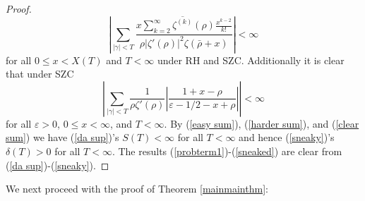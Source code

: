 \documentclass[11pt,article]{amsart}
\numberwithin{equation}{section}
\numberwithin{equation}{section}
\numberwithin{lemma}{section}
\numberwithin{prop}{section}
\begin{document}
\begin{proof}
\begin{equation}
\left|\sum_{\left|\gamma\right|<T}\frac{x\sum_{k=2}^{\infty}\overline{\zeta^{(k)}}(\rho)\frac{x^{k-2}}{k!}}{\rho \left|\zeta'(\rho)\right|^{2}\zeta\left(\bar{\rho}+x\right)}\right|<\infty \label{harder sum}
\end{equation}
for all $0\leq x<X(T)$ and $T<\infty$ under RH and SZC. Additionally it is clear that under SZC 
\begin{equation} 
\left|\sum_{\left|\gamma\right|<T}\frac{1}{\rho\zeta'(\rho)}\left|\frac{1+x-\rho}{\varepsilon-1/2-x+\rho}\right|\right|<\infty \label{clear sum}
\end{equation}
for all $\varepsilon>0$, $0\leq x<\infty$, and $T<\infty$. By (\ref{easy sum}), (\ref{harder sum}), and (\ref{clear sum}) we have (\ref{da sup})'s $S(T)<\infty$ for all $T<\infty$ and hence (\ref{sneaky})'s $\delta(T)>0$ for all $T<\infty$. The results (\ref{probterm1})-(\ref{sneaked}) are clear from (\ref{da sup})-(\ref{sneaky}).
\end{proof}


We next proceed with the proof of Theorem \ref{mainmainthm}:
\end{document}
